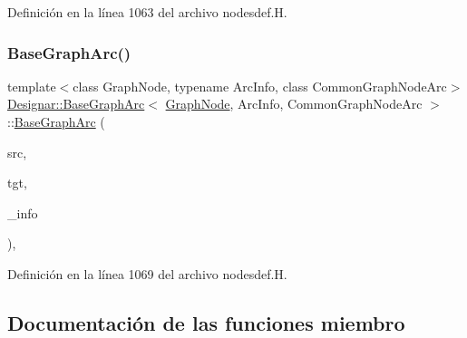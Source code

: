 Definición en la línea 1063 del archivo nodesdef.\+H.

\mbox{\label{class_designar_1_1_base_graph_arc_a150cb81ef3f2baac1abee99adae6f410}} 
\subsubsection{\texorpdfstring{Base\+Graph\+Arc()}{BaseGraphArc()}\hspace{0.1cm}{\footnotesize\ttfamily [4/4]}}
{\footnotesize\ttfamily template$<$class Graph\+Node, typename Arc\+Info, class Common\+Graph\+Node\+Arc$>$ \\
\hyperlink{class_designar_1_1_base_graph_arc}{Designar\+::\+Base\+Graph\+Arc}$<$ \hyperlink{class_designar_1_1_graph_node}{Graph\+Node}, Arc\+Info, Common\+Graph\+Node\+Arc $>$\+::\hyperlink{class_designar_1_1_base_graph_arc}{Base\+Graph\+Arc} (\begin{DoxyParamCaption}\item[{\hyperlink{class_designar_1_1_graph_node}{Graph\+Node} $\ast$}]{src,  }\item[{\hyperlink{class_designar_1_1_graph_node}{Graph\+Node} $\ast$}]{tgt,  }\item[{Arc\+Info \&\&}]{\+\_\+info }\end{DoxyParamCaption})\hspace{0.3cm}{\ttfamily [inline]}, {\ttfamily [protected]}}



Definición en la línea 1069 del archivo nodesdef.\+H.



\subsection{Documentación de las funciones miembro}
\mbox{\label{class_designar_1_1_base_graph_arc_a756bd68ff9797ff54b53657c2a39730c}} 
